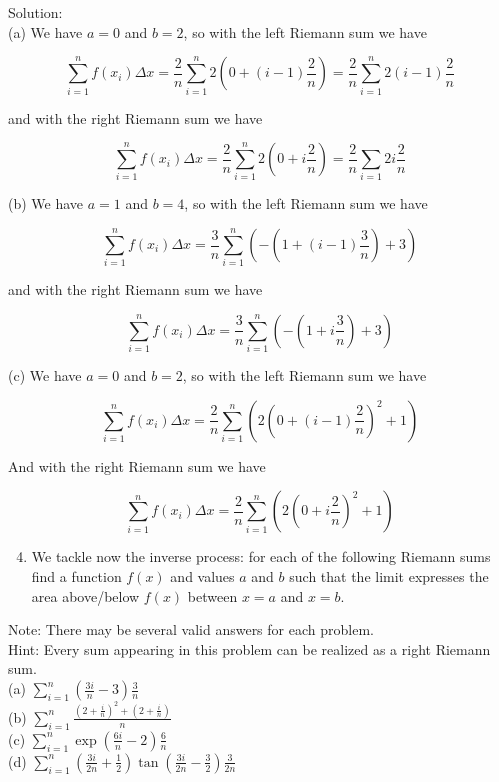 \documentclass[10pt]{article}
\begin{document}
Solution:\\
(a) We have $a=0$ and $b=2$, so with the left Riemann sum we have

$$
\sum_{i=1}^{n} f\left(x_{i}\right) \Delta x=\frac{2}{n} \sum_{i=1}^{n} 2\left(0+(i-1) \frac{2}{n}\right)=\frac{2}{n} \sum_{i=1}^{n} 2(i-1) \frac{2}{n}
$$

and with the right Riemann sum we have

$$
\sum_{i=1}^{n} f\left(x_{i}\right) \Delta x=\frac{2}{n} \sum_{i=1}^{n} 2\left(0+i \frac{2}{n}\right)=\frac{2}{n} \sum_{i=1} 2 i \frac{2}{n}
$$

(b) We have $a=1$ and $b=4$, so with the left Riemann sum we have

$$
\sum_{i=1}^{n} f\left(x_{i}\right) \Delta x=\frac{3}{n} \sum_{i=1}^{n}\left(-\left(1+(i-1) \frac{3}{n}\right)+3\right)
$$

and with the right Riemann sum we have

$$
\sum_{i=1}^{n} f\left(x_{i}\right) \Delta x=\frac{3}{n} \sum_{i=1}^{n}\left(-\left(1+i \frac{3}{n}\right)+3\right)
$$

(c) We have $a=0$ and $b=2$, so with the left Riemann sum we have

$$
\sum_{i=1}^{n} f\left(x_{i}\right) \Delta x=\frac{2}{n} \sum_{i=1}^{n}\left(2\left(0+(i-1) \frac{2}{n}\right)^{2}+1\right)
$$

And with the right Riemann sum we have

$$
\sum_{i=1}^{n} f\left(x_{i}\right) \Delta x=\frac{2}{n} \sum_{i=1}^{n}\left(2\left(0+i \frac{2}{n}\right)^{2}+1\right)
$$

\begin{enumerate}
  \setcounter{enumi}{3}
  \item We tackle now the inverse process: for each of the following Riemann sums find a function $f(x)$ and values $a$ and $b$ such that the limit expresses the area above/below $f(x)$ between $x=a$ and $x=b$.
\end{enumerate}

Note: There may be several valid answers for each problem.\\
Hint: Every sum appearing in this problem can be realized as a right Riemann sum.\\
(a) $\sum_{i=1}^{n}\left(\frac{3 i}{n}-3\right) \frac{3}{n}$\\
(b) $\sum_{i=1}^{n} \frac{\left(2+\frac{i}{n}\right)^{2}+\left(2+\frac{i}{n}\right)}{n}$\\
(c) $\sum_{i=1}^{n} \exp \left(\frac{6 i}{n}-2\right) \frac{6}{n}$\\
(d) $\sum_{i=1}^{n}\left(\frac{3 i}{2 n}+\frac{1}{2}\right) \tan \left(\frac{3 i}{2 n}-\frac{3}{2}\right) \frac{3}{2 n}$
\end{document}
